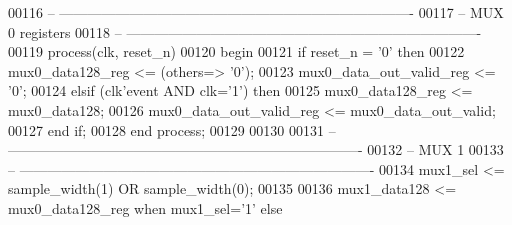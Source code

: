 \begin{DoxyCode}
00116 \textcolor{keyword}{-- ----------------------------------------------------------------------------}
00117 \textcolor{keyword}{-- MUX 0 registers}
00118 \textcolor{keyword}{-- ----------------------------------------------------------------------------}
00119 \textcolor{keywordflow}{process}(clk, reset_n)
00120 \textcolor{vhdlkeyword}{begin }
00121     \textcolor{keywordflow}{if} \textcolor{vhdlchar}{reset_n} \textcolor{vhdlchar}{=} \textcolor{vhdlchar}{'}\textcolor{vhdllogic}{}\textcolor{vhdllogic}{0}\textcolor{vhdlchar}{'} \textcolor{keywordflow}{then} 
00122         \textcolor{vhdlchar}{mux0_data128_reg}            \textcolor{vhdlchar}{<=} \textcolor{vhdlchar}{(}\textcolor{keywordflow}{others}\textcolor{vhdlchar}{=}\textcolor{vhdlchar}{>} \textcolor{vhdlchar}{'}\textcolor{vhdllogic}{}\textcolor{vhdllogic}{0}\textcolor{vhdlchar}{'}\textcolor{vhdlchar}{)};
00123         \textcolor{vhdlchar}{mux0_data_out_valid_reg} \textcolor{vhdlchar}{<=} \textcolor{vhdlchar}{'}\textcolor{vhdllogic}{}\textcolor{vhdllogic}{0}\textcolor{vhdlchar}{'};
00124     \textcolor{keywordflow}{elsif} \textcolor{vhdlchar}{(}\textcolor{vhdlchar}{clk}\textcolor{vhdlchar}{'}\textcolor{vhdlkeyword}{event} \textcolor{keywordflow}{AND} \textcolor{vhdlchar}{clk}\textcolor{vhdlchar}{=}\textcolor{vhdlchar}{'}\textcolor{vhdllogic}{}\textcolor{vhdllogic}{1}\textcolor{vhdlchar}{'}\textcolor{vhdlchar}{)} \textcolor{keywordflow}{then} 
00125         \textcolor{vhdlchar}{mux0_data128_reg}            \textcolor{vhdlchar}{<=} \textcolor{vhdlchar}{mux0_data128};
00126         \textcolor{vhdlchar}{mux0_data_out_valid_reg} \textcolor{vhdlchar}{<=} \textcolor{vhdlchar}{mux0_data_out_valid};
00127     \textcolor{keywordflow}{end} \textcolor{keywordflow}{if};
00128 \textcolor{keywordflow}{end} \textcolor{keywordflow}{process};
00129 
00130 
00131 \textcolor{keyword}{-- ----------------------------------------------------------------------------}
00132 \textcolor{keyword}{-- MUX 1 }
00133 \textcolor{keyword}{-- ----------------------------------------------------------------------------}
00134 \textcolor{vhdlchar}{mux1_sel}                    \textcolor{vhdlchar}{<=} \textcolor{vhdlchar}{sample_width}\textcolor{vhdlchar}{(}\textcolor{vhdllogic}{}\textcolor{vhdllogic}{1}\textcolor{vhdlchar}{)} \textcolor{keywordflow}{OR} \textcolor{vhdlchar}{sample_width}\textcolor{vhdlchar}{(}\textcolor{vhdllogic}{}\textcolor{vhdllogic}{0}\textcolor{vhdlchar}{)};
00135 
00136 \textcolor{vhdlchar}{mux1_data128}                \textcolor{vhdlchar}{<=} \textcolor{vhdlchar}{mux0_data128_reg}             \textcolor{keywordflow}{when} \textcolor{vhdlchar}{mux1_sel}\textcolor{vhdlchar}{=}\textcolor{vhdlchar}{'}\textcolor{vhdllogic}{}\textcolor{vhdllogic}{1}\textcolor{vhdlchar}{'} \textcolor{keywordflow}{else} 

\end{DoxyCode}
